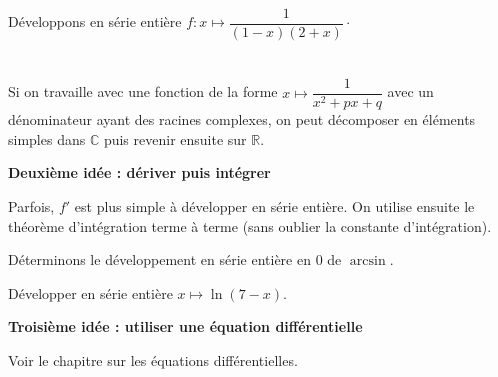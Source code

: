 \documentclass[french,11pt,twoside]{VcCours}
\begin{document}
\begin{Exemple}{} Développons en série entière $f : x \mapsto \dfrac{1}{(1-x)(2+x)}\cdot$

\vspace{8cm}
\end{Exemple}
\medskip



$\phantom{test}$
\vspace{5cm}
\begin{Remarque}{} Si on travaille avec une fonction de la forme $x \mapsto \dfrac{1}{x^2+px+q}$ avec un dénominateur ayant des racines complexes, on peut décomposer en éléments simples dans $\mathbb{C}$ puis revenir ensuite sur $\mathbb{R}$.
\end{Remarque}

\medskip


\textbf{Deuxième idée : dériver puis intégrer}

Parfois, $f'$ est plus simple à développer en série entière. On utilise ensuite le théorème d'intégration terme à terme (sans oublier la constante d'intégration).

\medskip
\newpage
\begin{Exemple}{} Déterminons le développement en série entière en $0$ de $\arcsin$.

\vspace{17.5cm}
\end{Exemple}

\begin{ApplicationDirecte}{} Développer en série entière $x \mapsto \ln(7-x)$.
\end{ApplicationDirecte}

\medskip

\textbf{Troisième idée : utiliser une équation différentielle}

Voir le chapitre sur les équations différentielles.
\end{document}
